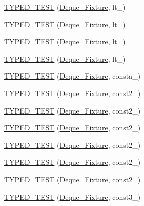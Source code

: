 \begin{DoxyCompactItemize}
\item 
\hyperlink{TestDeque_8c_09_09_a8761c9b876fc6b1669114347db99a6af}{T\-Y\-P\-E\-D\-\_\-\-T\-E\-S\-T} (\hyperlink{structDeque__Fixture}{Deque\-\_\-\-Fixture}, lt\-\_)
\item 
\hyperlink{TestDeque_8c_09_09_a6d778db7e70cdbfbb52f4eab3548ea74}{T\-Y\-P\-E\-D\-\_\-\-T\-E\-S\-T} (\hyperlink{structDeque__Fixture}{Deque\-\_\-\-Fixture}, lt\-\_)
\item 
\hyperlink{TestDeque_8c_09_09_a11a4a066c6d6c49f77914d9d93b3bc31}{T\-Y\-P\-E\-D\-\_\-\-T\-E\-S\-T} (\hyperlink{structDeque__Fixture}{Deque\-\_\-\-Fixture}, lt\-\_)
\item 
\hyperlink{TestDeque_8c_09_09_abfbe24128e89e0a865ea58b66012e62c}{T\-Y\-P\-E\-D\-\_\-\-T\-E\-S\-T} (\hyperlink{structDeque__Fixture}{Deque\-\_\-\-Fixture}, lt\-\_)
\item 
\hyperlink{TestDeque_8c_09_09_aa3b6185d72b91d7911698ad65d8976ff}{T\-Y\-P\-E\-D\-\_\-\-T\-E\-S\-T} (\hyperlink{structDeque__Fixture}{Deque\-\_\-\-Fixture}, consta\-\_)
\item 
\hyperlink{TestDeque_8c_09_09_a9c593f1e94b74fed16f1dbd8a3479083}{T\-Y\-P\-E\-D\-\_\-\-T\-E\-S\-T} (\hyperlink{structDeque__Fixture}{Deque\-\_\-\-Fixture}, const2\-\_)
\item 
\hyperlink{TestDeque_8c_09_09_abd80ac0f3ca979557be28590d27ae380}{T\-Y\-P\-E\-D\-\_\-\-T\-E\-S\-T} (\hyperlink{structDeque__Fixture}{Deque\-\_\-\-Fixture}, const2\-\_)
\item 
\hyperlink{TestDeque_8c_09_09_a4a42370f6a7e85c45d16e71e25b344d3}{T\-Y\-P\-E\-D\-\_\-\-T\-E\-S\-T} (\hyperlink{structDeque__Fixture}{Deque\-\_\-\-Fixture}, const2\-\_)
\item 
\hyperlink{TestDeque_8c_09_09_a41fe2058230d93f8966258ac3a77540a}{T\-Y\-P\-E\-D\-\_\-\-T\-E\-S\-T} (\hyperlink{structDeque__Fixture}{Deque\-\_\-\-Fixture}, const2\-\_)
\item 
\hyperlink{TestDeque_8c_09_09_a8d624027fb2312fa66feffbcd5e9d153}{T\-Y\-P\-E\-D\-\_\-\-T\-E\-S\-T} (\hyperlink{structDeque__Fixture}{Deque\-\_\-\-Fixture}, const2\-\_)
\item 
\hyperlink{TestDeque_8c_09_09_acc006b696d66376aca687f20b1e3b272}{T\-Y\-P\-E\-D\-\_\-\-T\-E\-S\-T} (\hyperlink{structDeque__Fixture}{Deque\-\_\-\-Fixture}, const2\-\_)
\item 
\hyperlink{TestDeque_8c_09_09_aa36d9f7bbb26d578c4a5a03c232be97b}{T\-Y\-P\-E\-D\-\_\-\-T\-E\-S\-T} (\hyperlink{structDeque__Fixture}{Deque\-\_\-\-Fixture}, const3\-\_)
\item 

\end{DoxyCompactItemize}
